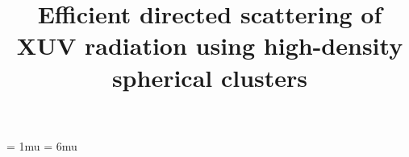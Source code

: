 \documentclass[10pt]{article}
\begin{document}



	\pagestyle{fancy}
	\fancyhf{}
	\fancyhead[L]{\textit{\nouppercase{\leftmark}}}
	\fancyfoot[C]{\thepage}

	\thinmuskip = 1mu
	\thickmuskip = 6mu
	\def\stacktype{S}\Sstackgap=-4.3pt
	\captionsetup[subfigure]{margin=0.05\textwidth}


	\newcommand{\subfigureautorefname}{\figureautorefname}


	\title{Efficient directed scattering of XUV radiation using high-density spherical clusters}
	\author{}
	\maketitle

	
	
	
	


	
	
\end{document}
